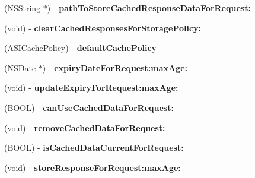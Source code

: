 \begin{DoxyCompactItemize}
\item 
\hypertarget{protocol_a_s_i_cache_delegate-p_ab7f2a212c2d6391b1d9fb7a8da9f2c39}{
(\hyperlink{class_n_s_string}{\-N\-S\-String} $\ast$) -\/ {\bfseries path\-To\-Store\-Cached\-Response\-Data\-For\-Request\-:}}
\label{protocol_a_s_i_cache_delegate-p_ab7f2a212c2d6391b1d9fb7a8da9f2c39}

\item 
\hypertarget{protocol_a_s_i_cache_delegate-p_abb2c511be4be2274bd3e812ea978e2a6}{
(void) -\/ {\bfseries clear\-Cached\-Responses\-For\-Storage\-Policy\-:}}
\label{protocol_a_s_i_cache_delegate-p_abb2c511be4be2274bd3e812ea978e2a6}

\item 
\hypertarget{protocol_a_s_i_cache_delegate-p_a1207aea079945294e7bb48c621d82a67}{
(\-A\-S\-I\-Cache\-Policy) -\/ {\bfseries default\-Cache\-Policy}}
\label{protocol_a_s_i_cache_delegate-p_a1207aea079945294e7bb48c621d82a67}

\item 
\hypertarget{protocol_a_s_i_cache_delegate-p_a36d0b83c9017dba94a93acc3cae9aa65}{
(\hyperlink{class_n_s_date}{\-N\-S\-Date} $\ast$) -\/ {\bfseries expiry\-Date\-For\-Request\-:max\-Age\-:}}
\label{protocol_a_s_i_cache_delegate-p_a36d0b83c9017dba94a93acc3cae9aa65}

\item 
\hypertarget{protocol_a_s_i_cache_delegate-p_ad793f424847f6f7a2c5154fb8cec1bb6}{
(void) -\/ {\bfseries update\-Expiry\-For\-Request\-:max\-Age\-:}}
\label{protocol_a_s_i_cache_delegate-p_ad793f424847f6f7a2c5154fb8cec1bb6}

\item 
\hypertarget{protocol_a_s_i_cache_delegate-p_a7cf0deb09983a6b552fd7a2130529c95}{
(\-B\-O\-O\-L) -\/ {\bfseries can\-Use\-Cached\-Data\-For\-Request\-:}}
\label{protocol_a_s_i_cache_delegate-p_a7cf0deb09983a6b552fd7a2130529c95}

\item 
\hypertarget{protocol_a_s_i_cache_delegate-p_a2e34141ed1db825ca2d1c292b068193e}{
(void) -\/ {\bfseries remove\-Cached\-Data\-For\-Request\-:}}
\label{protocol_a_s_i_cache_delegate-p_a2e34141ed1db825ca2d1c292b068193e}

\item 
\hypertarget{protocol_a_s_i_cache_delegate-p_a67c31b3473af7adba4cd548045935ac2}{
(\-B\-O\-O\-L) -\/ {\bfseries is\-Cached\-Data\-Current\-For\-Request\-:}}
\label{protocol_a_s_i_cache_delegate-p_a67c31b3473af7adba4cd548045935ac2}

\item 
\hypertarget{protocol_a_s_i_cache_delegate-p_ae7cfacf47d3d24e151530c033f993734}{
(void) -\/ {\bfseries store\-Response\-For\-Request\-:max\-Age\-:}}
\label{protocol_a_s_i_cache_delegate-p_ae7cfacf47d3d24e151530c033f993734}


\end{DoxyCompactItemize}
